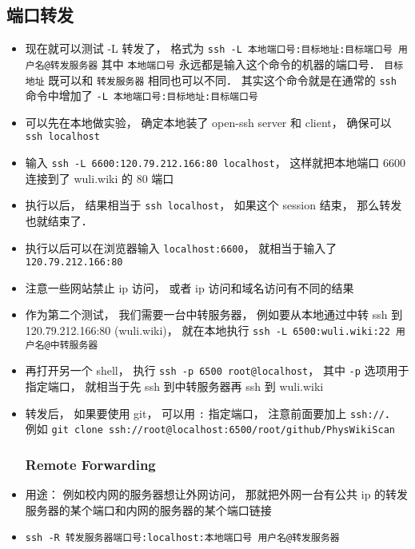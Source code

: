 \subsection{端口转发}
\begin{itemize}
\item 现在就可以测试 -L 转发了， 格式为 \verb`ssh -L 本地端口号:目标地址:目标端口号 用户名@转发服务器` 其中 \verb`本地端口号` 永远都是输入这个命令的机器的端口号． \verb`目标地址` 既可以和 \verb`转发服务器` 相同也可以不同． 其实这个命令就是在通常的 \verb`ssh` 命令中增加了 \verb`-L 本地端口号:目标地址:目标端口号`
\item 可以先在本地做实验， 确定本地装了 open-ssh server 和 client， 确保可以 \verb`ssh localhost`
\item 输入 \verb`ssh -L 6600:120.79.212.166:80 localhost`， 这样就把本地端口 6600 连接到了 wuli.wiki 的 80 端口
\item 执行以后， 结果相当于 \verb`ssh localhost`， 如果这个 session 结束， 那么转发也就结束了．
\item 执行以后可以在浏览器输入 \verb`localhost:6600`， 就相当于输入了 \verb`120.79.212.166:80`
\item 注意一些网站禁止 ip 访问， 或者 ip 访问和域名访问有不同的结果

\item 作为第二个测试， 我们需要一台中转服务器， 例如要从本地通过中转 ssh 到 120.79.212.166:80 (wuli.wiki)， 就在本地执行 \verb`ssh -L 6500:wuli.wiki:22 用户名@中转服务器`
\item 再打开另一个 shell， 执行 \verb`ssh -p 6500 root@localhost`， 其中 \verb`-p` 选项用于指定端口， 就相当于先 ssh 到中转服务器再 ssh 到 wuli.wiki

\item 转发后， 如果要使用 git， 可以用 \verb`:` 指定端口， 注意前面要加上 \verb`ssh://`．  例如 \verb`git clone ssh://root@localhost:6500/root/github/PhysWikiScan`

\subsubsection{Remote Forwarding}
\item 用途： 例如校内网的服务器想让外网访问， 那就把外网一台有公共 ip 的转发服务器的某个端口和内网的服务器的某个端口链接
\item \verb`ssh -R 转发服务器端口号:localhost:本地端口号 用户名@转发服务器`
\end{itemize}
